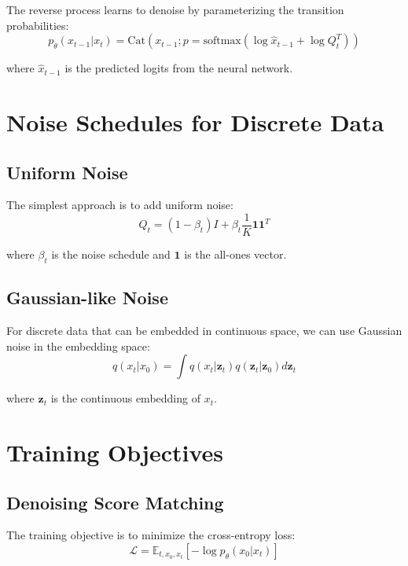 The reverse process learns to denoise by parameterizing the transition probabilities:
\begin{equation}
    p_\theta(x_{t-1} | x_t) = \text{Cat}(x_{t-1}; p = \text{softmax}(\log \hat{x}_{t-1} + \log Q_t^T))
\end{equation}

where $\hat{x}_{t-1}$ is the predicted logits from the neural network.

\section{Noise Schedules for Discrete Data}

\subsection{Uniform Noise}

The simplest approach is to add uniform noise:
\begin{equation}
    Q_t = (1 - \beta_t) I + \beta_t \frac{1}{K} \mathbf{1} \mathbf{1}^T
\end{equation}

where $\beta_t$ is the noise schedule and $\mathbf{1}$ is the all-ones vector.

\subsection{Gaussian-like Noise}

For discrete data that can be embedded in continuous space, we can use Gaussian noise in the embedding space:
\begin{equation}
    q(x_t | x_0) = \int q(x_t | \mathbf{z}_t) q(\mathbf{z}_t | \mathbf{z}_0) d\mathbf{z}_t
\end{equation}

where $\mathbf{z}_t$ is the continuous embedding of $x_t$.

\section{Training Objectives}

\subsection{Denoising Score Matching}

The training objective is to minimize the cross-entropy loss:
\begin{equation}
    \mathcal{L} = \mathbb{E}_{t, x_0, x_t} [-\log p_\theta(x_0 | x_t)]
\end{equation}

